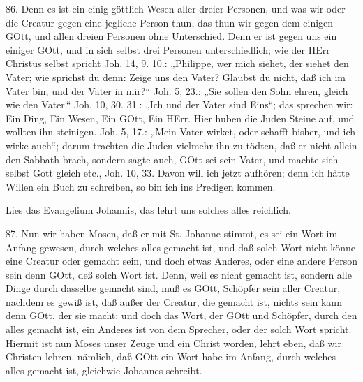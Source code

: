 86. Denn es ist ein einig göttlich Wesen aller dreier Personen, und was wir oder die Creatur gegen eine jegliche Person thun, das thun wir gegen dem einigen GOtt, und allen dreien Personen ohne Unterschied. Denn er ist gegen uns ein einiger GOtt, und in sich selbst drei Personen unterschiedlich; wie der HErr Christus selbst spricht Joh. 14, 9. 10.: „Philippe, wer mich siehet, der siehet den Vater; wie sprichst du denn: Zeige uns den Vater? Glaubst du nicht, daß ich im Vater bin, und der Vater in mir?“ Joh. 5, 23.: „Sie sollen den Sohn ehren, gleich wie den Vater.“ Joh. 10, 30. 31.: „Ich und der Vater sind Eins“; das sprechen wir: Ein Ding, Ein Wesen, Ein GOtt, Ein HErr. Hier huben die Juden Steine auf, und wollten ihn steinigen. Joh. 5, 17.: „Mein Vater wirket, oder schafft bisher, und ich wirke auch“; darum trachten die Juden vielmehr ihn zu tödten, daß er nicht allein den Sabbath brach, sondern sagte auch, GOtt sei sein Vater, und machte sich selbst Gott gleich etc., Joh. 10, 33. Davon will ich jetzt aufhören; denn ich hätte Willen ein Buch zu schreiben, so bin ich ins Predigen kommen.

Lies das Evangelium Johannis, das lehrt uns solches alles reichlich.

87. Nun wir haben Mosen, daß er mit St. Johanne stimmt, es sei ein Wort im Anfang gewesen, durch welches alles gemacht ist, und daß solch Wort nicht könne eine Creatur oder gemacht sein, und doch etwas Anderes, oder eine andere Person sein denn GOtt, deß solch Wort ist. Denn, weil es nicht gemacht ist, sondern alle Dinge durch dasselbe gemacht sind, muß es GOtt, Schöpfer sein aller Creatur, nachdem es gewiß ist, daß außer der Creatur, die gemacht ist, nichts sein kann denn GOtt, der sie macht; und doch das Wort, der GOtt und Schöpfer, durch den alles gemacht ist, ein Anderes ist von dem Sprecher, oder der solch Wort spricht. Hiermit ist nun Moses unser Zeuge und ein Christ worden, lehrt eben, daß wir Christen lehren, nämlich, daß GOtt ein Wort habe im Anfang, durch welches alles gemacht ist, gleichwie Johannes schreibt.

